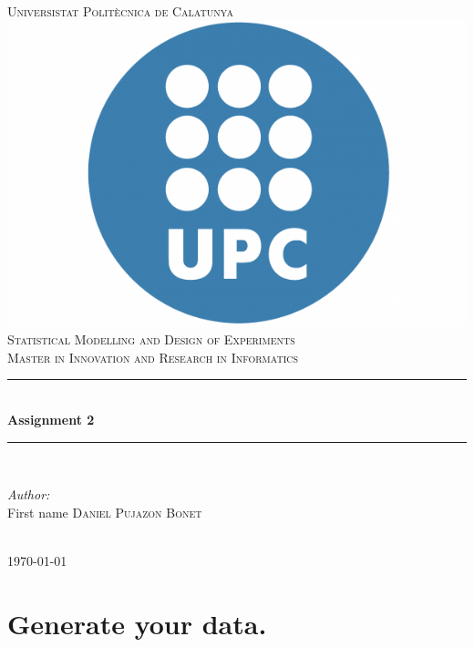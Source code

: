 \documentclass[12pt]{article}
\begin{document}
\begin{titlepage}
\newcommand{\HRule}{\rule{\linewidth}{0.5mm}} 

\center 

\textsc{\LARGE Universistat Polit\`{e}cnica de Calatunya}\\[1.5cm]
\includegraphics[scale=0.2]{Upc.PNG} \\[1cm]
\textsc{\Large Statistical Modelling and Design of Experiments}\\[0.5cm] 
\textsc{\normalsize Master in Innovation and Research in Informatics}\\[0.5cm] 

\HRule \\[0.4cm]
{ \Large \bfseries Assignment 2}\\[0.4cm]
\HRule \\[1.5cm]

\begin{minipage}{0.4\textwidth}
\begin{flushleft} \large
\emph{Author:}\\
First name \textsc{Daniel Pujazon Bonet}\\
\end{flushleft}

\end{minipage}\\[2cm]

{\large \today}\\[2cm]
\vfill

\end{titlepage}

\section {Generate your data.}
\vspace{5mm}
\end{document}
